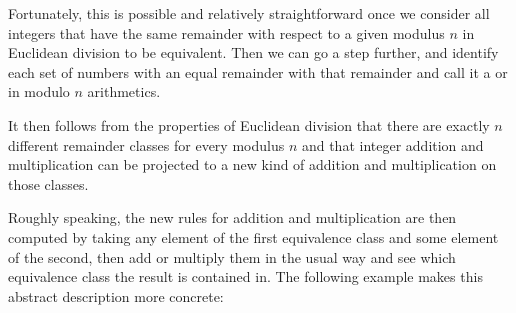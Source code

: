 Fortunately, this is possible and relatively straightforward once we consider all integers that have the same remainder with respect to a given modulus $n$ in Euclidean division to be equivalent. Then we can go a step further, and identify each set of numbers with an equal remainder with that remainder and call it a  or  in modulo $n$ arithmetics. 

It then follows from the properties of Euclidean division that there are exactly $ n $ different remainder classes for every modulus $n$ and that integer addition and multiplication can be projected to a new kind of addition and multiplication on those classes. 

Roughly speaking, the new rules for addition and multiplication are then computed by taking any element of the first equivalence class and some element of the second, then add or multiply them in the usual way and see which equivalence class the result is contained in.
The following example makes this abstract description more concrete:
